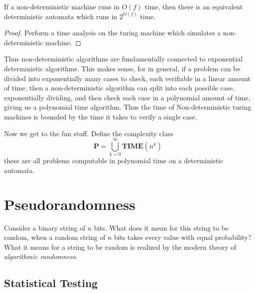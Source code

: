 \begin{theorem}
    If a non-deterministic machine runs in $O(f)$ time, then there is an equivalent deterministic automata which runs in $2^{O(f)}$ time.
\end{theorem}
\begin{proof}
    Perform a time analysis on the turing machine which simulates a non-deterministic machine.
\end{proof}

Thus non-deterministic algorithms are fundamentally connected to exponential deterministic algorithms. This makes sense, for in general, if a problem can be divided into exponentially many cases to check, each verifiable in a linear amount of time, then a non-deterministic algorithm can split into each possible case, exponentially dividing, and then check each case in a polynomial amount of time, giving us a polynomial time algorithm. Thus the time of Non-deterministic turing machines is bounded by the time it takes to verify a single case.

Now we get to the fun stuff. Define the complexity class
%
\[ \textbf{P} = \bigcup_{k = 0}^\infty \textbf{TIME}(n^k) \]
%
these are all problems computable in polynomial time on a deterministic automata.













\chapter{Pseudorandomness}

Consider a binary string of $n$ bits. What does it mean for this string to be random, when a random string of $n$ bits takes every value with equal probability? What it means for a string to be random is realized by the modern theory of \emph{algorithmic randomness}.

\section{Statistical Testing}

